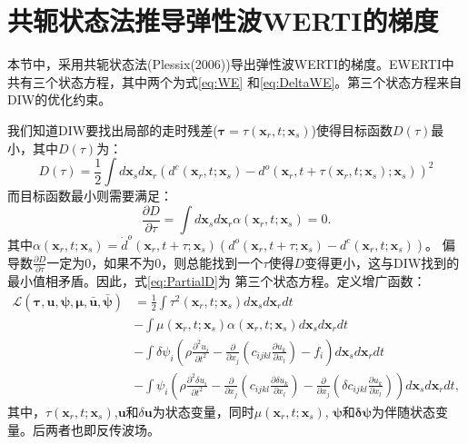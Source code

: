 \chapter{共轭状态法推导弹性波WERTI的梯度}
\label{cha:AdjointForEWERTI}
本节中，采用共轭状态法(Plessix(2006)\cite{plessix2006})导出弹性波WERTI的梯度。EWERTI中共有三个状态方程，其中两个为式\eqref{eq:WE}
和\eqref{eq:DeltaWE}。第三个状态方程来自DIW的优化约束。

我们知道DIW要找出局部的走时残差($\mathbf{\tau}=\tau(\mathbf{x}_r,t;\mathbf{x}_s)$)使得目标函数$D(\tau)$最小，其中$D(\tau)$为：
\begin{equation}
	D(\tau)=\frac{1}{2}\int
	d\mathbf{x}_sd\mathbf{x}_r(d^c(\mathbf{x}_r,t;\mathbf{x}_s)-
	d^o(\mathbf{x}_r,t+\tau(\mathbf{x}_r,t;\mathbf{x}_s);\mathbf{x}_s))^2
        \label{eq:Dl}
\end{equation}
而目标函数最小则需要满足：
\begin{equation}
	\frac{\partial D}{\partial \tau}=\int
	d\mathbf{x}_sd\mathbf{x}_r\alpha(\mathbf{x}_r,t;\mathbf{x}_s)=0.
        \label{eq:PartialD}
\end{equation}
其中$\alpha(\mathbf{x}_r,t;\mathbf{x}_s)=\dot{d}^o(\mathbf{x}_r,t+\tau;\mathbf{x}_s)(d^o(\mathbf{x}_r,t+\tau;\mathbf{x}_s)-
d^c(\mathbf{x}_r,t;\mathbf{x}_s))$。
偏导数$\frac{\partial D}{\partial
\tau}$一定为0，如果不为0，则总能找到一个$\tau$使得$D$变得更小，这与DIW找到的最小值相矛盾。因此，式\eqref{eq:PartialD}为
第三个状态方程。定义增广函数：
\begin{equation}
	\begin{split}
	\mathcal{L}(\mathbf{\tau},\mathbf{u},\mathbf{\psi},\mathbf{\mu},\bar{\mathbf{u}},\bar{\mathbf{\psi}})
	&=\frac{1}{2}\int \tau^2(\mathbf{x}_r,t;\mathbf{x}_s)d\mathbf{x}_sd\mathbf{x}_rdt\\
	&-\int
	\mu(\mathbf{x}_r,t;\mathbf{x}_s)\alpha(\mathbf{x}_r,t;\mathbf{x}_s)d\mathbf{x}_sd\mathbf{x}_rdt\\
	&-\int {\delta \psi_i}\left(\rho\frac{\partial^2 u_i }{\partial
	t^2}-\frac{\partial}{\partial x_j}(c_{ijkl}\frac{\partial u_k}{\partial x_l}) -
	f_i\right)d\mathbf{x}_sd\mathbf{x}_rdt\\
	&-\int \psi_i\left(\rho\frac{\partial^2
	\delta u_i }{\partial t^2}-\frac{\partial}{\partial x_j}(c_{ijkl}\frac{\partial
	\delta u_k}{\partial x_l})-\frac{\partial}{\partial x_j}(\delta
	c_{ijkl}\frac{\partial u_k}{\partial x_l})\right)d\mathbf{x}_sd\mathbf{x}_rdt,
	\end{split}
        \label{eq:Lagrangian}
\end{equation}
其中，$\tau(\mathbf{x}_r,t;\mathbf{x}_s)$,$\mathbf{u}$和$\delta \mathbf{u}$为状态变量，同时$\mu(\mathbf{x}_r,t;\mathbf{x}_s)$, 
$\boldsymbol{\psi}$和$\boldsymbol{\delta\psi}$为伴随状态变量。后两者也即反传波场。


